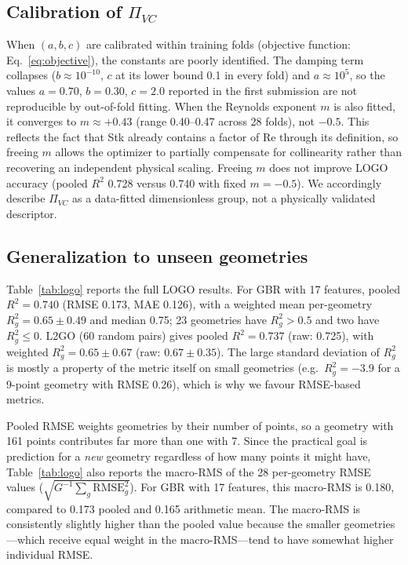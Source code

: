 \documentclass[12pt]{article}
\newcommand{\PiVC}{\Pi_{VC}}
\begin{document}
\subsection{Calibration of $\PiVC$}
\label{sec:calibration}

When $(a, b, c)$ are calibrated within training folds (objective function: Eq.~\eqref{eq:objective}), the constants are poorly identified. The damping term collapses ($b \approx 10^{-10}$, $c$ at its lower bound 0.1 in every fold) and $a \approx 10^{5}$, so the values $a=0.70$, $b=0.30$, $c=2.0$ reported in the first submission are not reproducible by out-of-fold fitting. When the Reynolds exponent $m$ is also fitted, it converges to $m \approx +0.43$ (range 0.40--0.47 across 28 folds), not $-0.5$. This reflects the fact that Stk already contains a factor of Re through its definition, so freeing $m$ allows the optimizer to partially compensate for collinearity rather than recovering an independent physical scaling. Freeing $m$ does not improve LOGO accuracy (pooled $R^2$ 0.728 versus 0.740 with fixed $m=-0.5$). We accordingly describe $\PiVC$ as a data-fitted dimensionless group, not a physically validated descriptor.

\subsection{Generalization to unseen geometries}
\label{sec:logo}

Table~\ref{tab:logo} reports the full LOGO results. For GBR with 17 features, pooled $R^2 = 0.740$ (RMSE 0.173, MAE 0.126), with a weighted mean per-geometry $R^2_g = 0.65 \pm 0.49$ and median 0.75; 23 geometries have $R^2_g > 0.5$ and two have $R^2_g \le 0$. L2GO (60 random pairs) gives pooled $R^2 = 0.737$ (raw: 0.725), with weighted $R^2_g = 0.65 \pm 0.67$ (raw: $0.67 \pm 0.35$). The large standard deviation of $R^2_g$ is mostly a property of the metric itself on small geometries (e.g.\ $R^2_g = -3.9$ for a 9-point geometry with RMSE 0.26), which is why we favour RMSE-based metrics.

Pooled RMSE weights geometries by their number of points, so a geometry with 161 points contributes far more than one with 7. Since the practical goal is prediction for a \emph{new} geometry regardless of how many points it might have, Table~\ref{tab:logo} also reports the macro-RMS of the 28 per-geometry RMSE values ($\sqrt{G^{-1}\sum_g \text{RMSE}_g^2}$). For GBR with 17 features, this macro-RMS is 0.180, compared to 0.173 pooled and 0.165 arithmetic mean. The macro-RMS is consistently slightly higher than the pooled value because the smaller geometries---which receive equal weight in the macro-RMS---tend to have somewhat higher individual RMSE.
\end{document}
